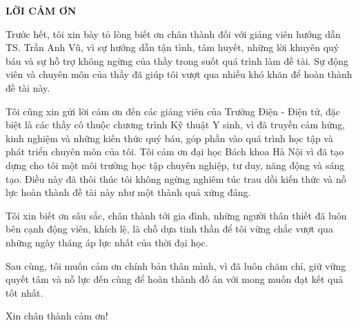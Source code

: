\documentclass[../DoAn.tex]{subfiles}
\begin{document}
\begin{center}
    \Large{\textbf{LỜI CẢM ƠN}}\\
\end{center}
\vspace{1cm}
Trước hết, tôi xin bày tỏ lòng biết ơn chân thành đối với giảng viên hướng dẫn TS. Trần Anh Vũ, vì sự hướng dẫn tận tình, tâm huyết, những lời khuyên quý báu và sự hỗ trợ không ngừng của thầy trong suốt quá trình làm đề tài. Sự động viên và chuyên môn của thầy đã giúp tôi vượt qua nhiều khó khăn để hoàn thành đề tài này.

Tôi cũng xin gửi lời cảm ơn đến các giảng viên của Trường Điện - Điện tử, đặc biệt là các thầy cô thuộc chương trình Kỹ thuật Y sinh, vì đã truyền cảm hứng, kinh nghiệm và những kiến thức quý báu, góp phần vào quá trình học tập và phát triển chuyên môn của tôi. Tôi cảm ơn đại học Bách khoa Hà Nội vì đã tạo dựng cho tôi một môi trường học tập chuyên nghiệp, tư duy, năng động và sáng tạo. Điều này đã thôi thúc tôi không ngừng nghiêm túc trau dồi kiến thức và nỗ lực hoàn thành đề tài này như một thành quả xứng đáng.

Tôi xin biết ơn sâu sắc, chân thành tới gia đình, những người thân thiết đã luôn bên cạnh động viên, khích lệ, là chỗ dựa tinh thần để tôi vững chắc vượt qua những ngày tháng áp lực nhất của thời đại học.

Sau cùng, tôi muốn cảm ơn chính bản thân mình, vì đã luôn chăm chỉ, giữ vững quyết tâm và nỗ lực đến cùng để hoàn thành đồ án với mong muốn đạt kết quả tốt nhất.

Xin chân thành cảm ơn!
\end{document}
